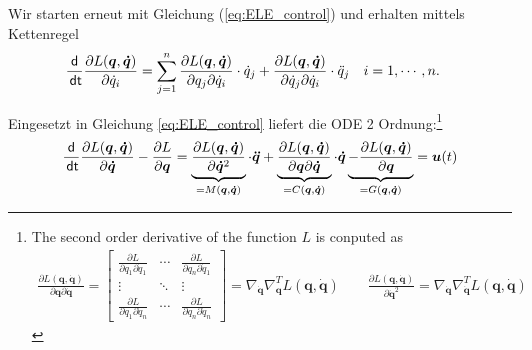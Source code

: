 \documentclass[a4paper, 12pt]{scrartcl}
\newcommand{\dt}{\thinspace \mathsf{dt}}
\begin{document}
\begin{beweis}
    Wir starten erneut mit Gleichung (\ref{eq:ELE_control}) und erhalten mittels Kettenregel
% 
    \begin{align*}
        \frac{\mathsf{d}}{\dt} 
        \frac{\partial L(\bm{q},\bm{\dot{q}})}{\partial \dot{q}_i}
        &=
        \sum_{j=1}^{n}
        \frac{\partial L(\bm{q},\bm{\dot{q}})}{\partial q_j \partial \dot{q}_i}
        \cdot 
        \dot{q}_j
        +
        \frac{\partial L(\bm{q},\bm{\dot{q}})}{\partial \dot{q}_j \partial \dot{q}_i}
        \cdot 
        \ddot{q}_j
        \quad
        i = 1, \cdots , n.
    \end{align*}

    Eingesetzt in Gleichung \ref{eq:ELE_control} liefert die ODE 2 Ordnung:\footnote{
        The second order derivative of the function $L$ is conputed as 
        \begin{align*}
            \frac{\partial L(\bm{q},\bm{\dot{q}})}{\partial \bm{q} \partial \bm{\dot{q}}}
            =
            \begin{bmatrix}
                \frac{\partial L}{\partial q_1 \partial \dot{q}_1}
                &
                \cdots 
                &
                \frac{\partial L}{\partial q_n \partial \dot{q}_1}
                \\
                \vdots
                &
                \ddots
                &
                \vdots
                \\
                \frac{\partial L}{\partial q_1 \partial \dot{q}_n}
                &
                \cdots
                &
                \frac{\partial L}{\partial q_n \partial \dot{q}_n}
            \end{bmatrix}
            =
            \nabla_{\bm{\dot{q}}} \nabla_{\bm{q}}^T L(\bm{q},\bm{\dot{q}})
            \qquad
            \frac{\partial L(\bm{q},\bm{\dot{q}})}{\partial \bm{\dot{q}}^2}
            =
            \nabla_{\bm{\dot{q}}} \nabla_{\bm{\dot{q}}}^T L(\bm{q},\bm{\dot{q}})
        \end{align*}
    }
    \begin{align}\label{eq:ELE_2nd_Order}
        \frac{\mathsf{d}}{\dt} 
        \frac{\partial L(\bm{q},\bm{\dot{q}})}{\partial \bm{\dot{q}}}
        -
        \frac{\partial L}{\partial \bm{q}}
        =
        \underbrace{
            \frac{\partial L(\bm{q},\bm{\dot{q}})}{\partial \bm{\dot{q}}^2}
        }_{
            = M(\bm{q}, \bm{\dot{q}})
        }
        \cdot 
        \bm{\ddot{q}}
        +
        \underbrace{
            \frac{\partial L(\bm{q},\bm{\dot{q}})}{\partial \bm{q} \partial \bm{\dot{q}}}
        }_{= C(\bm{q}, \bm{\dot{q}})}
        \cdot 
        \bm{\dot{q}}
        \underbrace{
            - \frac{\partial L(\bm{q},\bm{\dot{q}})}{\partial \bm{q}}
        }_{= G(\bm{q},\bm{\dot{q}})}
        =
        \bm{u}(t)
    \end{align}



\end{beweis}
\end{document}
